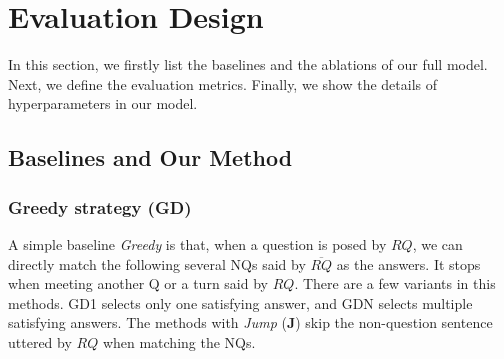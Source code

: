 \section{Evaluation Design}
\label{sec:eval}

In this section, we firstly list the baselines and the ablations of our full model. Next, we define the evaluation metrics. Finally, we show the details of hyperparameters in our model.

\subsection{Baselines and Our Method}
\subsubsection*{Greedy strategy (GD)} 
A simple baseline \textit{Greedy} is that, when a question is posed by $RQ$, we can directly match the following several NQs said by $\overline{RQ}$ as the answers. It stops when meeting another Q or a turn said by $RQ$. 
There are a few variants in this methods. GD1 selects only one satisfying answer, 
and GDN selects multiple satisfying answers. The methods with \textit{Jump} 
(\textbf{J}) skip the non-question sentence uttered by $RQ$ when matching the 
NQs. 



